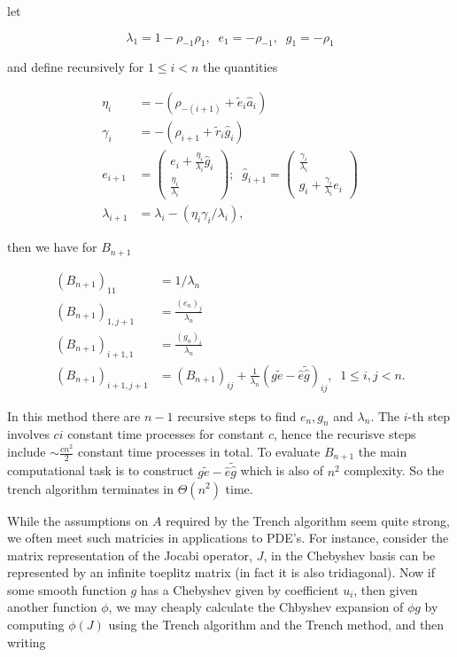 \documentclass{article}
\begin{document}
 let

 $$\lambda_1 = 1-\rho_{-1}\rho_{1}, \; \; e_1= -\rho_{-1}, \; \; g_1 = -\rho_1$$

 and define recursively for $1 \leq i < n$ the quantities

 \begin{align*}
     \eta_i &= -(\rho_{-(i+1)} + \tilde{e}_i \hat{a}_i) \\
     \gamma_i &= -(\rho_{i+1} + \tilde{r}_i\hat{g}_i) \\
     e_{i+1} &= \begin{pmatrix} e_i + \frac{\eta_i}{\lambda_i}\hat{g}_i \\
     \frac{\eta_i}{\lambda_i}\end{pmatrix}; \; \; \hat{g}_{i+1} = \begin{pmatrix} \frac{\gamma_i}{\lambda_i} \\
     \hat{g}_i + \frac{\gamma_i}{\lambda_i}e_i  \end{pmatrix} \\
     \lambda_{i+1} &= \lambda_i - (\eta_i\gamma_i/\lambda_i),
 \end{align*}

 then we have for $B_{n+1}$

 \begin{align*}
     (B_{n+1})_{11} &= 1/\lambda_n \\
     (B_{n+1})_{1,j+1} &= \frac{(e_n)_j}{\lambda_n}\\
     (B_{n+1})_{i+1,1} &= \frac{(g_n)_i}{\lambda_n} \\
     (B_{n+1})_{i+1,j+1} &= (B_{n+1})_{ij} + \frac{1}{\lambda_n}(g\tilde{e} - \hat{e}\tilde{\hat{g}})_{ij},   \; \;   1 \leq i,j < n.
 \end{align*}

 In this method there are $n-1$ recursive steps to find $e_n, g_n$ and $\lambda_n$. The $i$-th step involves $ci$ constant time processes for constant $c$, hence the recurisve steps include $\sim \frac{cn^2}{2}$ constant time processes in total. To evaluate $B_{n+1}$ the main computational task is to construct  $g\tilde{e} - \hat{e}\tilde{\hat{g}}$ which is also of $n^2$ complexity. So the trench algorithm terminates in $\Theta(n^2)$ time.

 While the assumptions on $A$ required by the Trench algorithm seem quite strong, we often meet such matricies in applications to PDE's. For instance, consider the matrix representation of the Jocabi operator, $J$, in the Chebyshev basis can be represented by an infinite toeplitz matrix (in fact it is also tridiagonal). Now if some smooth function $g$ has a Chebyshev given by coefficient $u_i$, then given another function $\phi$, we may cheaply calculate the Chbyshev expansion of $\phi g$ by computing $\phi(J)$ using the Trench algorithm and the Trench method, and then writing
\end{document}
